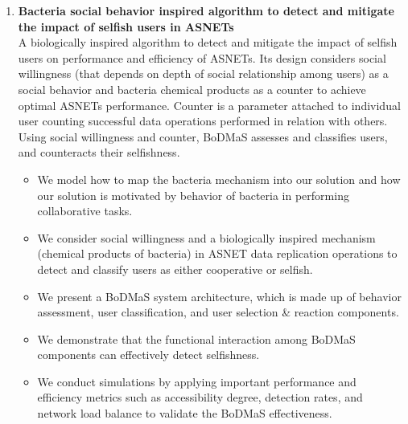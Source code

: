 \begin{enumerate}
\begin{itemize}
\end{itemize}
    \item \textbf{Bacteria social behavior inspired algorithm to detect and mitigate the impact of selfish users in ASNETs}
    \\
    A biologically inspired algorithm to detect and mitigate the impact of selfish users on performance and efficiency of ASNETs. Its design considers social willingness (that depends on depth of social relationship among users) as a social behavior and bacteria chemical products as a counter to achieve optimal ASNETs performance. Counter is a parameter attached to individual user counting successful data operations performed in relation with others. Using social willingness and counter, BoDMaS assesses and classifies users, and counteracts their selfishness.
        \begin{itemize}
            \item We model how to map the bacteria mechanism into our solution and how our solution is motivated by behavior of bacteria in performing collaborative tasks.
            \item We consider social willingness and a biologically inspired mechanism (chemical products of bacteria) in ASNET data replication operations to detect and classify users as either cooperative or selfish.
            \item We present a BoDMaS system architecture, which is made up of behavior assessment, user classification, and user selection \& reaction components.
            \item We demonstrate that the functional interaction among BoDMaS components can effectively detect selfishness.
            \item We conduct simulations by applying important performance and efficiency metrics such as accessibility degree, detection rates, and network load balance to validate the BoDMaS effectiveness.
\end{itemize}
\end{enumerate}

